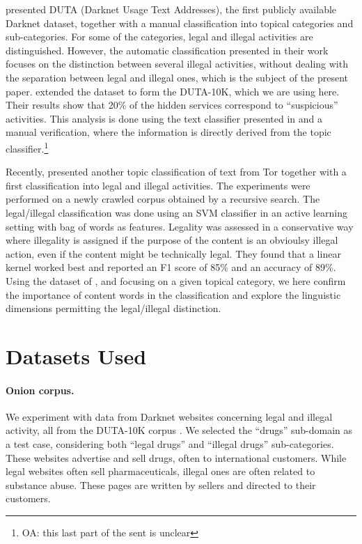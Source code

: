 \documentclass[11pt,a4paper,table]{article}
\newcommand{\oa}[1]{\footnote{\color{red}OA: #1}}
\begin{document}
\citet{AlNabki17} presented DUTA (Darknet Usage Text Addresses), the first publicly available Darknet dataset, together with a manual classification into topical categories and sub-categories. For some of the categories, legal and illegal activities are distinguished. However, the automatic classification presented in their work focuses on the distinction between several illegal activities, without dealing with the separation between legal and illegal ones, which is the subject of the present paper. \citet{AlNabki19} extended the dataset to form the DUTA-10K, which we are using here. Their results show that 20\% of the hidden services correspond to ``suspicious'' activities. This analysis is done using the text classifier presented in \citet{AlNabki17} and a manual verification, where the information is directly derived from the topic classifier.\oa{this last part of the sent is unclear}

Recently, \citet{Avarikioti18} presented another topic classification of text from Tor together with a first classification into legal and illegal activities.  The experiments were performed on a newly crawled corpus obtained by a recursive search. The legal/illegal classification was done using an SVM classifier in an active learning setting with bag of words as features. Legality was assessed in a conservative way where illegality is assigned if the purpose of the content is an obvioulsy illegal action, even if the content might be technically legal. They found that a linear kernel worked best and reported an F1 score of 85\% and an accuracy of 89\%. Using the dataset of \citet{AlNabki19}, and focusing on a given topical category, we here confirm the importance of content words in the classification and explore the linguistic dimensions permitting the legal/illegal distinction. 




\section{Datasets Used}\label{sec:datasets}

\paragraph{Onion corpus.}
We experiment with data from Darknet websites concerning
legal and illegal activity, all from the DUTA-10K corpus \citep{AlNabki19}.
We selected the ``drugs'' sub-domain as a test case, considering both ``legal drugs'' and ``illegal drugs'' sub-categories.
These websites advertise and sell
drugs, often to international customers.
While legal websites often sell pharmaceuticals,
illegal ones are often related to substance abuse.
These pages are written by sellers and directed to their customers.
  
\end{document}
